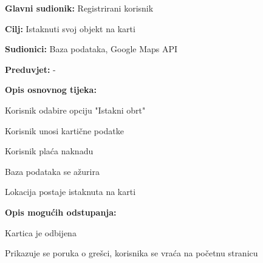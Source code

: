 					\noindent {}
					\begin{packed_item}
	
						\item \textbf{Glavni sudionik: }Registrirani korisnik
						\item  \textbf{Cilj:} Istaknuti svoj objekt na karti
						\item  \textbf{Sudionici:} Baza podataka, Google Maps API
						\item  \textbf{Preduvjet:} -
						\item  \textbf{Opis osnovnog tijeka:}
						
						\item[] \begin{packed_enum}
	
							\item Korisnik odabire opciju "Istakni obrt"
							\item Korisnik unosi kartične podatke
							\item Korisnik plaća naknadu
							\item Baza podataka se ažurira
							\item Lokacija postaje istaknuta na karti

						\end{packed_enum}
						
						\item  \textbf{Opis mogućih odstupanja:}
						
						\item[] \begin{packed_item}
	
							\item[3.a] Kartica je odbijena
							\item[] \begin{packed_enum}
								
								\item Prikazuje se poruka o grešci, korisnika se vraća na početnu stranicu
								
							\end{packed_enum}
							
						\end{packed_item}
						
					\end{packed_item}
					
